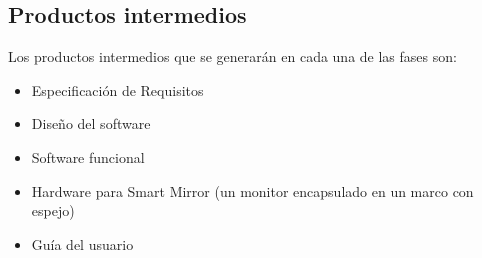 \subsection{Productos intermedios}

Los productos intermedios que se generarán en cada una de las fases son:

\begin{itemize}
	\item Especificación de Requisitos

	\item Diseño del software

	\item Software funcional

	\item Hardware para Smart Mirror (un monitor encapsulado en un marco con espejo)

	\item Guía del usuario

\end{itemize}